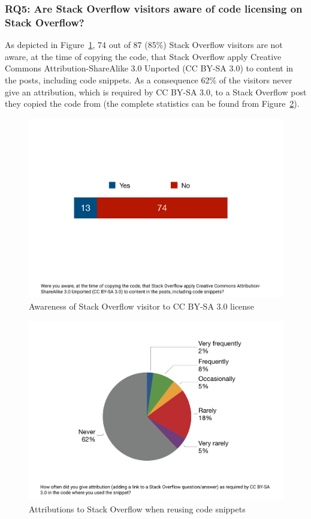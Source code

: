\documentclass{svjour3}                     %
\begin{document}
\subsubsection*{RQ5: Are Stack Overflow visitors aware of code licensing on Stack Overflow?}

As depicted in Figure~\ref{fig:survey_visitor_cc_by-sa}, 74 out of 87 (85\%)
Stack Overflow visitors are not aware, at the time of copying the code, that
Stack Overflow apply Creative Commons Attribution-ShareAlike 3.0 Unported (CC
BY-SA 3.0) to content in the posts, including code snippets. As a consequence
62\% of the visitors never give an attribution, which is required by CC BY-SA
3.0, to a Stack Overflow post they copied the code from (the complete statistics
can be found from Figure~\ref{fig:survey_visitor_attribution-sa}).

\begin{figure} \centering
	\includegraphics[width=.4\linewidth]{survey_visitor_cc_by_sa} 
	\caption{Awareness of Stack Overflow visitor to CC BY-SA 3.0 license}
	\label{fig:survey_visitor_cc_by-sa} 
\end{figure}

\begin{figure} \centering
	\includegraphics[width=.4\linewidth]{survey_visitor_attribution} 
	\caption{Attributions to Stack Overflow when reusing code snippets}
	\label{fig:survey_visitor_attribution-sa} 
\end{figure}

\end{document}
